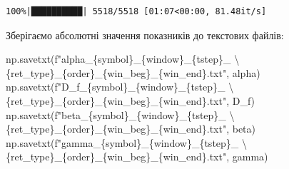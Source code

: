 \documentclass[
  letterpaper,
]{report}
\newenvironment{Shaded}{\begin{snugshade}}{\end{snugshade}}
\newcommand{\CharTok}[1]{\textcolor[rgb]{0.13,0.47,0.30}{#1}}
\newcommand{\NormalTok}[1]{\textcolor[rgb]{0.00,0.23,0.31}{#1}}
\newcommand{\SpecialCharTok}[1]{\textcolor[rgb]{0.37,0.37,0.37}{#1}}
\newcommand{\SpecialStringTok}[1]{\textcolor[rgb]{0.13,0.47,0.30}{#1}}
\begin{document}
\begin{verbatim}
100%|██████████| 5518/5518 [01:07<00:00, 81.48it/s]
\end{verbatim}

Зберігаємо абсолютні значення показників до текстових файлів:

\begin{Shaded}
\begin{Highlighting}[]
\NormalTok{np.savetxt(}\SpecialStringTok{f"alpha\_}\SpecialCharTok{\{}\NormalTok{symbol}\SpecialCharTok{\}}\SpecialStringTok{\_}\SpecialCharTok{\{}\NormalTok{window}\SpecialCharTok{\}}\SpecialStringTok{\_}\SpecialCharTok{\{}\NormalTok{tstep}\SpecialCharTok{\}}\SpecialStringTok{\_ }\CharTok{\textbackslash{}}
\SpecialStringTok{            }\SpecialCharTok{\{}\NormalTok{ret\_type}\SpecialCharTok{\}}\SpecialStringTok{\_}\SpecialCharTok{\{}\NormalTok{order}\SpecialCharTok{\}}\SpecialStringTok{\_}\SpecialCharTok{\{}\NormalTok{win\_beg}\SpecialCharTok{\}}\SpecialStringTok{\_}\SpecialCharTok{\{}\NormalTok{win\_end}\SpecialCharTok{\}}\SpecialStringTok{.txt"}\NormalTok{, alpha)}
\NormalTok{np.savetxt(}\SpecialStringTok{f"D\_f\_}\SpecialCharTok{\{}\NormalTok{symbol}\SpecialCharTok{\}}\SpecialStringTok{\_}\SpecialCharTok{\{}\NormalTok{window}\SpecialCharTok{\}}\SpecialStringTok{\_}\SpecialCharTok{\{}\NormalTok{tstep}\SpecialCharTok{\}}\SpecialStringTok{\_ }\CharTok{\textbackslash{}}
\SpecialStringTok{            }\SpecialCharTok{\{}\NormalTok{ret\_type}\SpecialCharTok{\}}\SpecialStringTok{\_}\SpecialCharTok{\{}\NormalTok{order}\SpecialCharTok{\}}\SpecialStringTok{\_}\SpecialCharTok{\{}\NormalTok{win\_beg}\SpecialCharTok{\}}\SpecialStringTok{\_}\SpecialCharTok{\{}\NormalTok{win\_end}\SpecialCharTok{\}}\SpecialStringTok{.txt"}\NormalTok{, D\_f)}
\NormalTok{np.savetxt(}\SpecialStringTok{f"beta\_}\SpecialCharTok{\{}\NormalTok{symbol}\SpecialCharTok{\}}\SpecialStringTok{\_}\SpecialCharTok{\{}\NormalTok{window}\SpecialCharTok{\}}\SpecialStringTok{\_}\SpecialCharTok{\{}\NormalTok{tstep}\SpecialCharTok{\}}\SpecialStringTok{\_ }\CharTok{\textbackslash{}}
\SpecialStringTok{            }\SpecialCharTok{\{}\NormalTok{ret\_type}\SpecialCharTok{\}}\SpecialStringTok{\_}\SpecialCharTok{\{}\NormalTok{order}\SpecialCharTok{\}}\SpecialStringTok{\_}\SpecialCharTok{\{}\NormalTok{win\_beg}\SpecialCharTok{\}}\SpecialStringTok{\_}\SpecialCharTok{\{}\NormalTok{win\_end}\SpecialCharTok{\}}\SpecialStringTok{.txt"}\NormalTok{, beta)}
\NormalTok{np.savetxt(}\SpecialStringTok{f"gamma\_}\SpecialCharTok{\{}\NormalTok{symbol}\SpecialCharTok{\}}\SpecialStringTok{\_}\SpecialCharTok{\{}\NormalTok{window}\SpecialCharTok{\}}\SpecialStringTok{\_}\SpecialCharTok{\{}\NormalTok{tstep}\SpecialCharTok{\}}\SpecialStringTok{\_ }\CharTok{\textbackslash{}}
\SpecialStringTok{            }\SpecialCharTok{\{}\NormalTok{ret\_type}\SpecialCharTok{\}}\SpecialStringTok{\_}\SpecialCharTok{\{}\NormalTok{order}\SpecialCharTok{\}}\SpecialStringTok{\_}\SpecialCharTok{\{}\NormalTok{win\_beg}\SpecialCharTok{\}}\SpecialStringTok{\_}\SpecialCharTok{\{}\NormalTok{win\_end}\SpecialCharTok{\}}\SpecialStringTok{.txt"}\NormalTok{, gamma)}
\end{Highlighting}
\end{Shaded}
\end{document}
